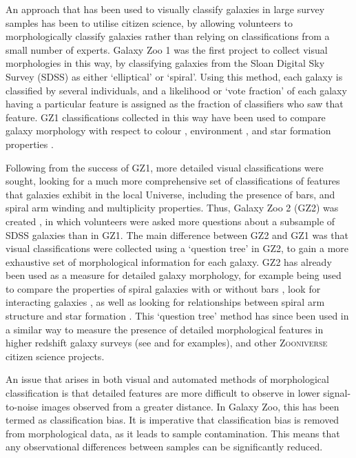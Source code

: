 \documentclass[useAMS,usenatbib]{mn2e}
\begin{document}
An approach that has been used to visually classify galaxies in large survey samples has been to utilise citizen science, by allowing volunteers to morphologically classify galaxies rather than relying on classifications from a small number of experts. Galaxy Zoo 1 \citep[GZ1;][]{Lintott_08,Lintott_11} was the first project to collect visual morphologies in this way, by classifying galaxies from the Sloan Digital Sky Survey (SDSS) as either `elliptical' or `spiral'. Using this method, each galaxy is classified by several individuals, and a likelihood or `vote fraction' of each galaxy having a particular feature is assigned as the fraction of classifiers who saw that feature. GZ1 classifications collected in this way have been used to compare galaxy morphology with respect to colour \citep{Bamford_09,Masters_10b,Masters_10a}, environment \citep{Bamford_09,Skibba_09}, and star formation properties \citep{Tojeiro_13,Schawinski_14,Smethurst_15}. 

Following from the success of GZ1, more detailed visual classifications were sought, looking for a much more comprehensive set of classifications of features that galaxies exhibit in the local Universe, including the presence of bars, and spiral arm winding and multiplicity properties. Thus, Galaxy Zoo 2 (GZ2) was created \citep[][hereafter W13]{Willett_13}, in which volunteers were asked more questions about a subsample of SDSS galaxies than in GZ1. The main difference between GZ2 and GZ1 was that visual classifications were collected using a `question tree' in GZ2, to gain a more exhaustive set of morphological information for each galaxy. GZ2 has already been used as a measure for detailed galaxy morphology, for example being used to compare the properties of spiral galaxies with or without bars \citep{Masters_11,Masters_12,Cheung_13}, look for interacting galaxies \citep{Casteels_13}, as well as looking for relationships between spiral arm structure and star formation \citep{Willett_15}. This `question tree' method has since been used in a similar way to measure the presence of detailed morphological features in higher redshift galaxy surveys (see \citet{Melvin_14} and \citet{Simmons_14} for examples), and other \textsc{Zooniverse} citizen science projects. 

An issue that arises in both visual and automated methods of morphological classification is that detailed features are more difficult to observe in lower signal-to-noise images observed from a greater distance. In Galaxy Zoo, this has been termed as classification bias. It is imperative that classification bias is removed from morphological data, as it leads to sample contamination. This means that any observational differences between samples can be significantly reduced.
\end{document}

